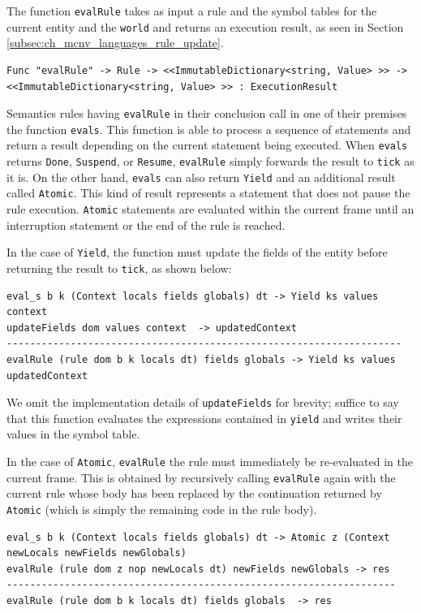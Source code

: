 The function \texttt{evalRule} takes as input a rule and the symbol tables for the current entity and the \texttt{world} and returns an execution result, as seen in Section \ref{subsec:ch_mcnv_languages_rule_update}.

\begin{lstlisting}
Func "evalRule" -> Rule -> <<ImmutableDictionary<string, Value> >> -> <<ImmutableDictionary<string, Value> >> : ExecutionResult
\end{lstlisting}

\noindent
Semantics rules having \texttt{evalRule} in their conclusion call in one of their premises the function \texttt{eval\tu s}. This function is able to process a sequence of statements and return a result depending on the current statement being executed. When \texttt{eval\tu s} returns \texttt{Done}, \texttt{Suspend}, or \texttt{Resume}, \texttt{evalRule} simply forwards the result to \texttt{tick} as it is. On the other hand, \texttt{eval\tu s} can also return \texttt{Yield} and an additional result called \texttt{Atomic}. This kind of result represents a statement that does not pause the rule execution. \texttt{Atomic} statements are evaluated within the current frame until an interruption statement or the end of the rule is reached.

In the case of \texttt{Yield}, the function must update the fields of the entity before returning the result to \texttt{tick}, as shown below:

\begin{lstlisting}
eval_s b k (Context locals fields globals) dt -> Yield ks values context
updateFields dom values context  -> updatedContext
--------------------------------------------------------------------
evalRule (rule dom b k locals dt) fields globals -> Yield ks values updatedContext
\end{lstlisting}

\noindent
We omit the implementation details of \texttt{updateFields} for brevity; suffice to say that this function evaluates the expressions contained in \texttt{yield} and writes their values in the symbol table.

In the case of \texttt{Atomic}, \texttt{evalRule} the rule must immediately be re-evaluated in the current frame. This is obtained by recursively calling \texttt{evalRule} again with the current rule whose body has been replaced by the continuation returned by \texttt{Atomic} (which is simply the remaining code in the rule body).

\begin{lstlisting}
eval_s b k (Context locals fields globals) dt -> Atomic z (Context newLocals newFields newGlobals)
evalRule (rule dom z nop newLocals dt) newFields newGlobals -> res
-------------------------------------------------------------------
evalRule (rule dom b k locals dt) fields globals  -> res
\end{lstlisting}

